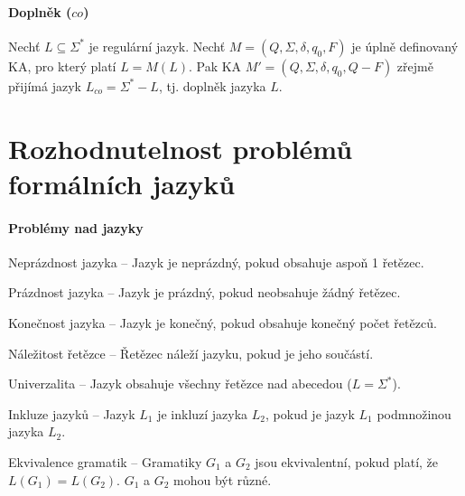 \paragraph*{Doplněk ($co$)} Nechť $L \subseteq \Sigma^*$ je regulární jazyk. Nechť $M = (Q, \Sigma, \delta, q_0, F)$ je úplně definovaný KA, pro který platí $L = M(L)$. Pak KA $M' = (Q, \Sigma, \delta, q_0, Q - F)$ zřejmě přijímá jazyk $L_{co} = \Sigma^* - L$, tj. doplněk jazyka $L$.



\section{Rozhodnutelnost problémů formálních jazyků}

\paragraph*{Problémy nad jazyky} \begin{compactitem}
    \item Neprázdnost jazyka -- Jazyk je neprázdný, pokud obsahuje aspoň 1 řetězec.

    \item Prázdnost jazyka -- Jazyk je prázdný, pokud neobsahuje žádný řetězec.

    \item Konečnost jazyka -- Jazyk je konečný, pokud obsahuje konečný počet řetězců.

    \item Náležitost řetězce -- Řetězec náleží jazyku, pokud je jeho součástí.

    \item Univerzalita -- Jazyk obsahuje všechny řetězce nad abecedou ($L = \Sigma^* $).

    \item Inkluze jazyků -- Jazyk $L_1$ je inkluzí jazyka $L_2$, pokud je jazyk $L_1$ podmnožinou jazyka $L_2$.

    \item Ekvivalence gramatik -- Gramatiky $G_1$ a $G_2$ jsou ekvivalentní, pokud platí, že\break $L(G_1) = L(G_2)$. $G_1$ a $G_2$ mohou být různé.
\end{compactitem}

